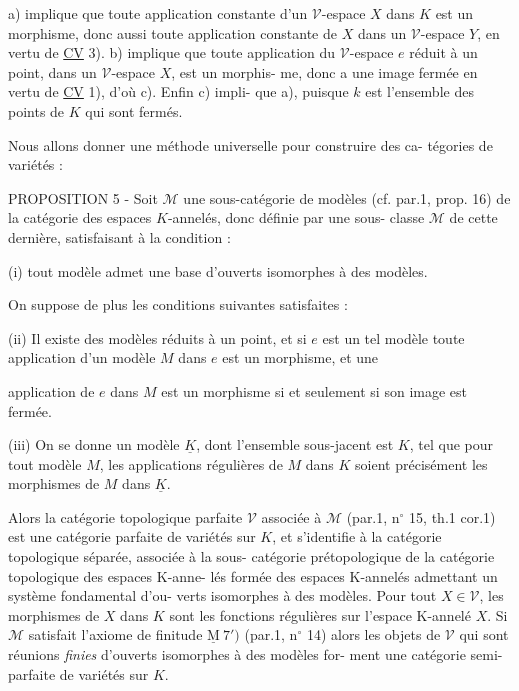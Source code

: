 a) implique que toute application constante d'un $\mathcal{V}$-espace $X$ dans
$K$ est un morphisme, donc aussi toute application constante de $X$ dans
un $\mathcal{V}$-espace $Y$, en vertu de \underline{CV} 3). b) implique que toute application
du $\mathcal{V}$-espace $e$ réduit à un point, dans un $\mathcal{V}$-espace $X$, est un morphis-
me, donc a une image fermée en vertu de \underline{CV} 1), d'où c). Enfin c) impli-
que a), puisque $k$ est l'ensemble des points de $K$ qui sont fermés.

Nous allons donner une méthode universelle pour construire des ca-
tégories de variétés :

PROPOSITION 5 - Soit $\mathcal{M}$ une sous-catégorie de modèles (cf. par.1, prop.
16) de la catégorie des espaces $K$-annelés, donc définie par une sous-
classe $\mathcal{M}$ de cette dernière, satisfaisant à la condition :

(i) tout modèle admet une base d'ouverts isomorphes à des modèles.

On suppose de plus les conditions suivantes satisfaites :

(ii) Il existe des modèles réduits à un point, et si $e$ est un tel modèle
toute application d'un modèle $M$ dans $e$ est un morphisme, et une

\newpage



application de $e$ dans $M$ est un morphisme si et seulement si son image
est fermée.

(iii) On se donne un modèle $\underline{K}$, dont l'ensemble sous-jacent est $K$, tel
que pour tout modèle $M$, les applications régulières de $M$ dans $K$ soient
précisément les morphismes de $M$ dans $\underline{K}$.

Alors la catégorie topologique parfaite $\mathcal{V}$ associée à $\mathcal{M}$ (par.1,
n$^\circ$ 15, th.1 cor.1) est une catégorie parfaite de variétés sur $K$, et
s'identifie à la catégorie topologique séparée, associée à la sous-
catégorie prétopologique de la catégorie topologique des espaces K-anne-
lés formée des espaces K-annelés admettant un système fondamental d'ou-
verts isomorphes à des modèles. Pour tout $X \in \mathcal{V}$, les morphismes de $X$
dans $K$ sont les fonctions régulières sur l'espace K-annelé $X$. Si $\mathcal{M}$
satisfait l'axiome de finitude $\underline{\text{M}}\ 7')$ (par.1, n$^\circ$ 14) alors les objets
de $\mathcal{V}$ qui sont réunions \emph{finies} d'ouverts isomorphes à des modèles for-
ment une catégorie semi-parfaite de variétés sur $K$.

